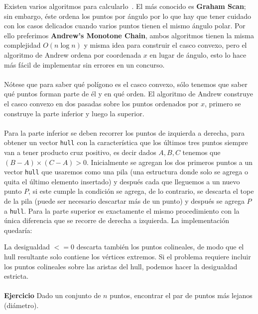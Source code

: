 Existen varios algoritmos para calcularlo~\cite{cpalgos_convex}. El más conocido es \textbf{Graham Scan}; sin embargo, éste ordena los puntos por ángulo por lo que hay que tener cuidado con los casos delicados cuando varios puntos tienen el mismo ángulo polar. Por ello preferimos \textbf{Andrew's Monotone Chain}, ambos algoritmos tienen la misma complejidad $O(n \log n)$ y misma idea para construir el casco convexo, pero el algoritmo de Andrew ordena por coordenada $x$ en lugar de ángulo, esto lo hace más fácil de implementar sin errores en un concurso.
\\\\Nótese que para saber qué polígono es el casco convexo, sólo tenemos que saber qué puntos forman parte de él y en qué orden. El algoritmo de Andrew construye el casco convexo en dos pasadas sobre los puntos ordenados por $x$, primero se construye la parte inferior y luego la superior.
\\\\Para la parte inferior se deben recorrer los puntos de izquierda a derecha, para obtener un vector \texttt{hull} con la característica que los últimos tres puntos siempre van a tener producto cruz positivo, es decir dados $A,B,C$ tenemos que $(B-A)\times(C-A)>0$. Inicialmente se agregan los dos primeros puntos a un vector \texttt{hull} que usaremos como una pila (una estructura donde solo se agrega o quita el último elemento insertado) y después cada que lleguemos a un nuevo punto $P$, si este cumple la condición se agrega, de lo contrario, se descarta el tope de la pila (puede ser necesario descartar más de un punto) y después se agrega $P$ a \texttt{hull}. Para la parte superior es exactamente el mismo procedimiento con la única diferencia que se recorre de derecha a izquierda. La implementación quedaría:

 La desigualdad $<=0$ descarta también los puntos colineales, de modo que el hull resultante solo contiene los vértices extremos. Si el problema requiere incluir los puntos colineales sobre las aristas del hull, podemos hacer la desigualdad estricta.
\\\\\textbf{Ejercicio} Dado un conjunto de $n$ puntos, encontrar el par de puntos más lejanos (diámetro).
